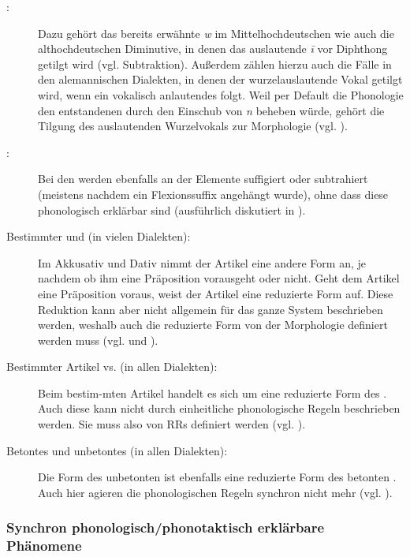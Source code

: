 \begin{description}
\item [:] Dazu gehört das bereits erwähnte \textit{w} im Mittelhochdeutschen wie auch die althochdeutschen Diminutive, in denen das auslautende \textit{\=i} vor Diphthong getilgt wird (vgl.  Subtraktion). Außerdem zählen hierzu auch die Fälle in den alemannischen Dialekten, in denen der wurzelauslautende Vokal getilgt wird, wenn ein vokalisch anlautendes  folgt. Weil per Default die Phonologie den entstandenen  durch den Einschub von \textit{n} beheben würde, gehört die Tilgung des auslautenden Wurzelvokals zur Morphologie (vgl. ).
\item [:] Bei den  werden ebenfalls an der  Elemente suffigiert oder subtrahiert (meistens nachdem ein Flexionssuffix angehängt wurde), ohne dass diese phonologisch erklärbar sind (ausführlich diskutiert in ).
\item [Bestimmter und  (in vielen Dialekten):] Im Akkusativ und Dativ nimmt der Artikel eine andere Form an, je nachdem ob ihm eine Präposition vorausgeht oder nicht. Geht dem Artikel eine Präposition voraus, weist der Artikel eine reduzierte Form auf. Diese Reduktion kann aber nicht allgemein für das ganze System beschrieben werden, weshalb auch die reduzierte Form von der Morphologie definiert werden muss (vgl.  und ).
\item [Bestimmter Artikel vs.  (in allen Dialekten):] Beim bestim-\linebreak mten Artikel handelt es sich um eine reduzierte Form des . Auch diese kann nicht durch einheitliche phonologische Regeln beschrieben werden. Sie muss also von RRs definiert werden (vgl. ).
\item [Betontes und unbetontes  (in allen Dialekten):] Die Form des unbetonten  ist ebenfalls eine reduzierte Form des betonten . Auch hier agieren die phonologischen Regeln synchron nicht mehr (vgl. ).
\end{description}


\subsubsection{Synchron phonologisch/phonotaktisch erklärbare Phänomene}

